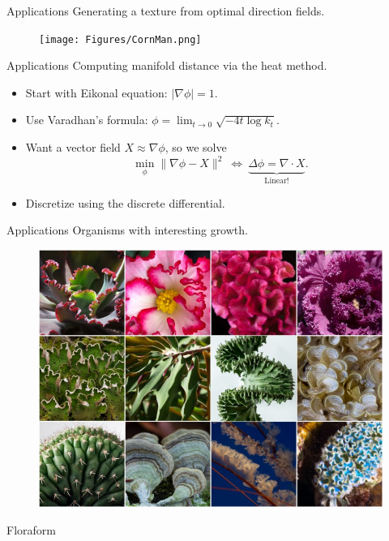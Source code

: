 \documentclass[UKenglish]{beamer}
\begin{document}
\begin{frame}{Applications}
    Generating a texture from optimal direction fields.
    \begin{figure}
        \centering
        \texttt{[image: Figures/CornMan.png]}
    \end{figure}
\end{frame}

\begin{frame}{Applications}
    Computing manifold distance via the heat method.
    \begin{itemize}
        \item Start with Eikonal equation: $|\nabla \phi|=1$.
        \item Use Varadhan's formula: $\phi = \lim_{t\to 0} \sqrt{-4t\log k_t}$.
        \item Want a vector field $X\approx \nabla \phi$, so we solve
        \[
        \min_{\phi} \|\nabla \phi -X \|^2 ~\iff~ \underbrace{\Delta \phi = \nabla \cdot X}_{\textrm{Linear!}}.
        \]
        \item Discretize using the discrete differential.
    \end{itemize}
\end{frame}

\begin{frame}{Applications}
    Organisms with interesting growth.
    \begin{figure}
        \centering
        \includegraphics[width=.8\textwidth]{Figures/ruffledStuff-750x562.jpg}
    \end{figure}
\end{frame}

\begin{frame}{Floraform}
\end{frame}
\end{document}

